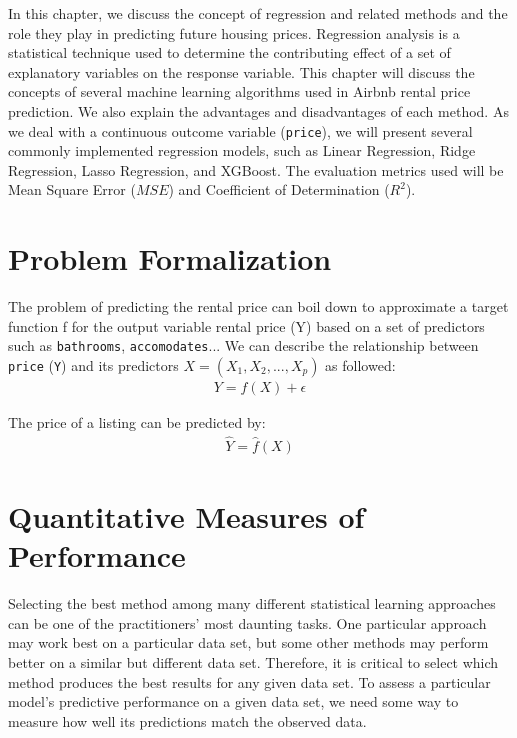 In this chapter, we discuss the concept of regression and related methods and
the role they play in predicting future housing prices. Regression analysis is a
statistical technique used to determine the contributing effect of a set of
explanatory variables on the response variable.
This chapter will discuss the concepts of several machine learning algorithms
used in Airbnb rental price prediction. We also explain the advantages and
disadvantages of each method.  As we deal with a continuous outcome variable
(\texttt{price}), we will present several commonly implemented regression models,
such as Linear Regression, Ridge Regression, Lasso Regression, and XGBoost.  The
evaluation metrics used will be Mean Square Error ($MSE$) and Coefficient of
Determination ($R^2$).

\section{Problem Formalization}

The problem of predicting the rental price can boil down to approximate a target
function f for the output variable rental price (Y) based on a set of predictors
such as \texttt{bathrooms}, \texttt{accomodates}...
We can describe the relationship between \texttt{price} (\texttt{Y}) and its
predictors $ X = (X_1, X_2, . . . , X_p) $ as followed:
\begin{eqnarray}
    Y = f(X) + \epsilon
    \label{eqn:relationship-eqn}
\end{eqnarray}

The  price of a listing can be predicted by:
\begin{eqnarray}
    \hat{Y} = \hat{f}(X)
    \label{eqn:predicted-value}
\end{eqnarray}

\section{Quantitative Measures of Performance}

Selecting the best method among many different statistical learning approaches
can be one of the practitioners' most daunting tasks.  One particular approach
may work best on a particular data set, but some other methods may perform
better on a similar but different data set.
Therefore, it is critical to select which method produces the best results for
any given data set.
To assess a particular model's predictive performance on a given data set, we
need some way to measure how well its predictions match the observed data.

